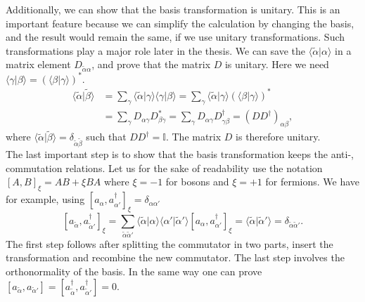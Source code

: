 \documentclass[../main.tex]{subfile}
\begin{document}
Additionally, we can show that the basis transformation is unitary. This is an important feature because we can simplify the calculation by changing the basis, and
the result would remain the same, if we use unitary transformations. Such transformations play a major role later in the thesis.
We can save the $\langle \tilde{\alpha} | \alpha\rangle$ in a matrix element $D_{\tilde{\alpha}\alpha}$, and prove that the matrix $D$ is unitary. Here we need
$\langle \gamma | \beta\rangle = (\langle \beta | \gamma\rangle)^{\ast}$.
\begin{align*}
    \langle \tilde{\alpha} | \tilde{\beta}\rangle  &= \sum_{\gamma} \langle \tilde{\alpha}|\gamma\rangle\langle \gamma | \beta\rangle =  \sum_{\gamma} \langle \tilde{\alpha}|\gamma\rangle (\langle \beta | \gamma\rangle)^{\ast}\\
    &=\sum_{\gamma} D_{\alpha\gamma}D_{\beta\gamma}^{\ast} = \sum_{\gamma} D_{\alpha\gamma}D^{\dagger}_{\gamma\beta} = (DD^{\dagger})_{\alpha\beta},
\end{align*} 
where $\langle \tilde{\alpha} | \tilde{\beta}\rangle = \delta_{\tilde{\alpha} \tilde{\beta}}$ such that $DD^{\dagger} = \mathbb{I}$. The matrix $D$ is therefore unitary.\\

The last important step is to show that the basis transformation keeps the anti-, commutation relations. Let us for the sake of readability
use the notation $[A,B]_{\xi} = AB + \xi BA$ where $\xi = -1$ for bosons and $\xi = +1$ for fermions. We have for example, using $[a_{\alpha}, a_{\alpha'}^{\dagger}]_{\xi} = \delta_{\alpha\alpha'}$
\[
    [a_{\tilde{\alpha}}, a_{\tilde{\alpha}'}^{\dagger}]_{\xi} = \sum_{\tilde{\alpha}\tilde{\alpha}'} \langle \tilde{\alpha}|\alpha\rangle\langle\alpha'|\tilde{\alpha}'\rangle [a_{\alpha}, a_{\alpha'}^{\dagger}]_{\xi} = \langle \tilde{\alpha}|\tilde{\alpha}'\rangle = \delta_{\tilde{\alpha}\tilde{\alpha}'}.
\]
The first step follows after splitting the commutator in two parts, insert the transformation and recombine the new commutator. 
The last step involves the orthonormality of the basis.
In the same way one can prove $[a_{\tilde{\alpha}},a_{\tilde{\alpha}'}] = [a_{\tilde{\alpha}}^{\dagger},a_{\tilde{\alpha}'}^{\dagger}] = 0$.
  
\end{document}
